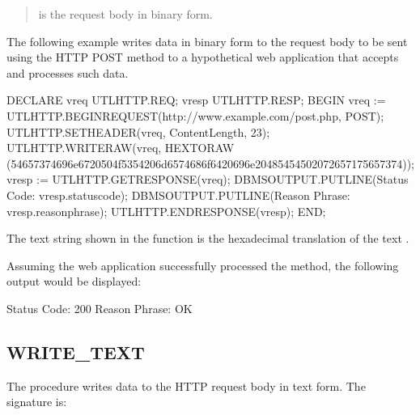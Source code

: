 \documentclass[letterpaper,10pt,english,openany,oneside]{sphinxmanual}
\begin{document}
\begin{quote}

 is the request body in binary form.
\end{quote}


The following example writes data in binary form to the request body to
be sent using the HTTP POST method to a hypothetical web application
that accepts and processes such data.

%
\begin{sphinxVerbatim}[commandchars=\\\{\}]
DECLARE
    v\PYGZus{}req           UTL\PYGZus{}HTTP.REQ;
    v\PYGZus{}resp          UTL\PYGZus{}HTTP.RESP;
BEGIN
    v\PYGZus{}req := UTL\PYGZus{}HTTP.BEGIN\PYGZus{}REQUEST(\PYGZsq{}http://www.example.com/post.php\PYGZsq{},
       \PYGZsq{}POST\PYGZsq{});
    UTL\PYGZus{}HTTP.SET\PYGZus{}HEADER(v\PYGZus{}req, \PYGZsq{}Content\PYGZhy{}Length\PYGZsq{}, \PYGZsq{}23\PYGZsq{});
    UTL\PYGZus{}HTTP.WRITE\PYGZus{}RAW(v\PYGZus{}req, HEXTORAW
(\PYGZsq{}54657374696e6720504f5354206d6574686f6420696e20485454502072657175657374\PYGZsq{}));
    v\PYGZus{}resp := UTL\PYGZus{}HTTP.GET\PYGZus{}RESPONSE(v\PYGZus{}req);
    DBMS\PYGZus{}OUTPUT.PUT\PYGZus{}LINE(\PYGZsq{}Status Code: \PYGZsq{} \textbar{}\textbar{} v\PYGZus{}resp.status\PYGZus{}code);
    DBMS\PYGZus{}OUTPUT.PUT\PYGZus{}LINE(\PYGZsq{}Reason Phrase: \PYGZsq{} \textbar{}\textbar{} v\PYGZus{}resp.reason\PYGZus{}phrase);
    UTL\PYGZus{}HTTP.END\PYGZus{}RESPONSE(v\PYGZus{}resp);
END;
\end{sphinxVerbatim}

The text string shown in the  function is the hexadecimal
translation of the text .

Assuming the web application successfully processed the  method, the
following output would be displayed:

%
\begin{sphinxVerbatim}[commandchars=\\\{\}]
Status Code: 200
Reason Phrase: OK
\end{sphinxVerbatim}

\newpage


\subsection{WRITE\_TEXT}
\label{\detokenize{utl_http:write-text}}
The  procedure writes data to the HTTP request body in text
form. The signature is:
\begin{quote}

\end{quote}
\end{document}
